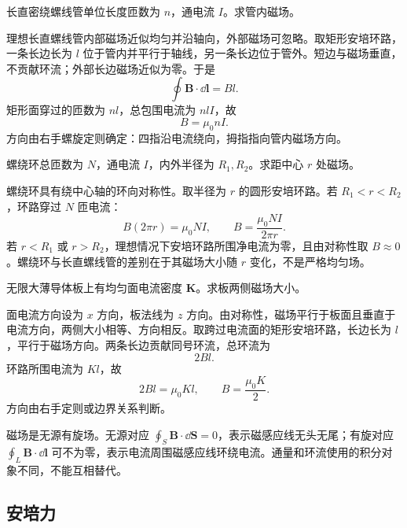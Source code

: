 \begin{example}[title={长直螺线管内磁场}]\label{eg:solenoid-B}
长直密绕螺线管单位长度匝数为 $n$，通电流 $I$。求管内磁场。
\begin{solution}
理想长直螺线管内部磁场近似均匀并沿轴向，外部磁场可忽略。取矩形安培环路，一条长边长为 $l$ 位于管内并平行于轴线，另一条长边位于管外。短边与磁场垂直，不贡献环流；外部长边磁场近似为零。于是
\[
  \oint\bm B\cdot\dd\bm l=Bl.
\]
矩形面穿过的匝数为 $nl$，总包围电流为 $n l I$，故
\[
  B=\mu_0 nI.
\]
方向由右手螺旋定则确定：四指沿电流绕向，拇指指向管内磁场方向。
\end{solution}
\end{example}

\begin{example}[title={螺绕环的磁场}]\label{eg:toroid-B}
螺绕环总匝数为 $N$，通电流 $I$，内外半径为 $R_1,R_2$。求距中心 $r$ 处磁场。
\begin{solution}
螺绕环具有绕中心轴的环向对称性。取半径为 $r$ 的圆形安培环路。若 $R_1<r<R_2$，环路穿过 $N$ 匝电流：
\[
  B(2\pi r)=\mu_0 NI,\qquad
  B=\frac{\mu_0 NI}{2\pi r}.
\]
若 $r<R_1$ 或 $r>R_2$，理想情况下安培环路所围净电流为零，且由对称性取 $B\approx0$。螺绕环与长直螺线管的差别在于其磁场大小随 $r$ 变化，不是严格均匀场。
\end{solution}
\end{example}

\begin{example}[title={无限大均匀面电流的磁场}]\label{eg:surface-current-B}
无限大薄导体板上有均匀面电流密度 $\bm K$。求板两侧磁场大小。
\begin{solution}
面电流方向设为 $x$ 方向，板法线为 $z$ 方向。由对称性，磁场平行于板面且垂直于电流方向，两侧大小相等、方向相反。取跨过电流面的矩形安培环路，长边长为 $l$，平行于磁场方向。两条长边贡献同号环流，总环流为
\[
  2Bl.
\]
环路所围电流为 $Kl$，故
\[
  2Bl=\mu_0Kl,\qquad
  B=\frac{\mu_0K}{2}.
\]
方向由右手定则或边界关系判断。
\end{solution}
\end{example}

\begin{pitfall}[磁场环流不为零不表示磁通量不为零]
磁场是无源有旋场。无源对应 $\oint_S\bm B\cdot\dd\bm S=0$，表示磁感应线无头无尾；有旋对应 $\oint_L\bm B\cdot\dd\bm l$ 可不为零，表示电流周围磁感应线环绕电流。通量和环流使用的积分对象不同，不能互相替代。
\end{pitfall}

\subsection{安培力}

